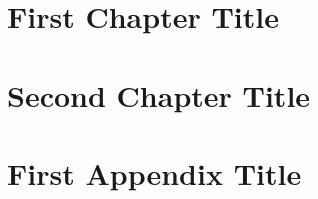\documentclass[11pt,masters]{unc_dissertation}
\begin{document}
\pagestyle{plain}

\chapter{First Chapter Title}


\chapter{Second Chapter Title}


\appendix

\chapter{First Appendix Title}



\backmatter


\end{document}
